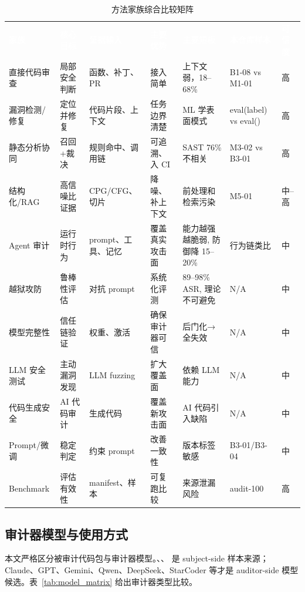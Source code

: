 \documentclass[11pt,a4paper,onecolumn]{article}
\newcommand{\tabheader}[1]{\textcolor{white}{\textbf{#1}}}
\begin{document}
\begin{table}[htbp]
\caption{方法家族综合比较矩阵}
\label{tab:method_matrix}
\centering
\small
\begin{tabularx}{\textwidth}{@{} p{}X X X X X p{} @{}}
\rowcolor{tabhead}
\tabheader{家族} & \tabheader{核心目标} & \tabheader{证据输入} & \tabheader{主要优势} & \tabheader{主要短板} & \tabheader{本仓库样本} & \tabheader{可信度} \\
\rowcolor{tabalt} 直接代码审查 & 局部安全判断 & 函数、补丁、PR & 接入简单 & 上下文弱，18--68\% & B1-08 vs M1-01 & 高 \\
漏洞检测/修复 & 定位并修复 & 代码片段、上下文 & 任务边界清楚 & ML 学表面模式 & eval(label) vs eval() & 高 \\
\rowcolor{tabalt} 静态分析协同 & 召回+裁决 & 规则命中、调用链 & 可追溯、入 CI & SAST 76\% 不相关 & M3-02 vs B3-01 & 高 \\
结构化/RAG & 高信噪比证据 & CPG/CFG、切片 & 降噪、补上下文 & 前处理和检索污染 & M5-01 & 中--高 \\
\rowcolor{tabalt} Agent 审计 & 运行时行为 & prompt、工具、记忆 & 覆盖真实攻击面 & 能力越强越脆弱, 防御降 15--20\% & 行为链类比 & 中 \\
越狱攻防 & 鲁棒性评估 & 对抗 prompt & 系统化评测 & 89--98\% ASR, 理论不可避免 & N/A & 中 \\
\rowcolor{tabalt} 模型完整性 & 信任链验证 & 权重、激活 & 确保审计器可信 & 后门化→全失效 & N/A & 中 \\
LLM 安全测试 & 主动漏洞发现 & LLM fuzzing & 扩大覆盖面 & 依赖 LLM 能力 & N/A & 中 \\
\rowcolor{tabalt} 代码生成安全 & AI 代码审计 & 生成代码 & 覆盖新攻击面 & AI 代码引入缺陷 & N/A & 中 \\
Prompt/微调 & 稳定判定 & 约束 prompt & 改善一致性 & 版本标签敏感 & B3-01/B3-04 & 中 \\
\rowcolor{tabalt} Benchmark & 评估有效性 & manifest、样本 & 可复跑比较 & 来源泄漏风险 & audit-100 & 高 \\
\end{tabularx}
\end{table}

\subsection{审计器模型与使用方式}
本文严格区分被审计代码包与审计器模型。、、 是 subject-side 样本来源；Claude、GPT、Gemini、Qwen、DeepSeek、StarCoder 等才是 auditor-side 模型候选。表~\ref{tab:model_matrix} 给出审计器类型比较。
\end{document}
